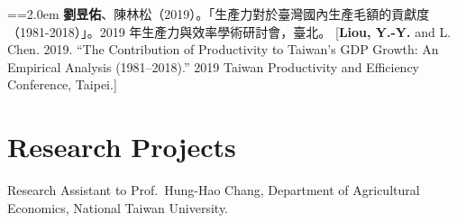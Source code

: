 \documentclass[11pt,letterpaper]{article}
\newenvironment{hanglist}{\par\setlength{\parindent}{0pt}\everypar={\hangindent=2.0em\hangafter=1}}{\par}
\begin{document}
\begin{hanglist}
\textbf{劉昱佑}、陳林松（2019）。「生產力對於臺灣國內生產毛額的貢獻度（1981-2018）」。2019 年生產力與效率學術研討會，臺北。 \newline{} {[}\textbf{Liou, Y.-Y.} and L. Chen. 2019. ``The Contribution of Productivity to Taiwan's GDP Growth: An Empirical Analysis (1981--2018).'' 2019 Taiwan Productivity and Efficiency Conference, Taipei.{]}

\end{hanglist}

\hypertarget{research-projects}{%
\section{Research Projects}\label{research-projects}}

Research Assistant to Prof.~Hung-Hao Chang, Department of Agricultural Economics, National Taiwan University.
\end{document}
